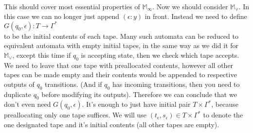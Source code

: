 \documentclass[12pt]{article}
\begin{document}
This should cover most essential properties of $\mathbb{ M}_\infty$. Now we should consider $\mathbb{ M}_\vee$.  In this case we can no longer just append $(\epsilon:y)$ in front. Instead we need to define \\
$G(q_0,\epsilon) : T \rightarrow \Gamma^*$ \\
to be the initial contents of each tape. Many such  automata can be reduced to equivalent automata with empty initial tapes, in the same way as we did it for $\mathbb{ M}_\vee$, except this time if $q_0$ is accepting state, then we check which tape accepts. We need to leave that one tape with preallocated contents, however all other tapes can be made empty and their contents would be appended to respective outputs of $q_0$ transitions. (And if $q_0$ has incoming transitions, then you need to duplicate $q_0$ before modifying its outputs). Therefore we can conclude that we don't even need $G(q_0,\epsilon)$. It's enough to just have initial pair $T \times \Gamma^*$, because preallocating only one tape suffices. We will use $(t_\epsilon,s_\epsilon) \in T \times \Gamma^*$ to denote the one designated  tape and it's initial contents (all other tapes are empty). 
\end{document}
